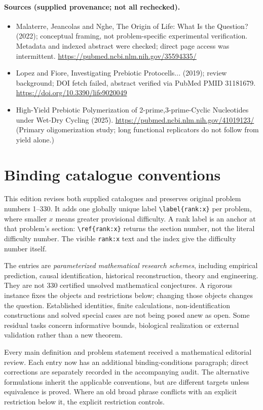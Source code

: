 \documentclass[11pt]{article}
\begin{document}
\paragraph{Sources (supplied provenance; not all rechecked).} \begin{itemize}
\item Malaterre, Jeancolas and Nghe, The Origin of Life: What Is the Question? (2022); conceptual framing, not problem-specific experimental verification. Metadata and indexed abstract were checked; direct page access was intermittent. \url{https://pubmed.ncbi.nlm.nih.gov/35594335/}
\item Lopez and Fiore, Investigating Prebiotic Protocells... (2019); review background; DOI fetch failed, abstract verified via PubMed PMID 31181679. \url{https://doi.org/10.3390/life9020049}
\item High-Yield Prebiotic Polymerization of 2-prime,3-prime-Cyclic Nucleotides under Wet-Dry Cycling (2025). \url{https://pubmed.ncbi.nlm.nih.gov/41019123/} (Primary oligomerization study; long functional replicators do not follow from yield alone.)
\end{itemize}


\section*{Binding catalogue conventions}
This edition revises both supplied catalogues and preserves original problem numbers 1--330. It adds one globally unique label \verb|\label{rank:x}| per problem, where smaller $x$ means greater provisional difficulty. A rank label is an anchor at that problem's section: \verb|\ref{rank:x}| returns the section number, not the literal difficulty number. The visible \texttt{rank:x} text and the index give the difficulty number itself.

The entries are \emph{parameterized mathematical research schemes}, including empirical prediction, causal identification, historical reconstruction, theory and engineering. They are not 330 certified unsolved mathematical conjectures. A rigorous instance fixes the objects and restrictions below; changing those objects changes the question. Established identities, finite calculations, non-identification constructions and solved special cases are not being posed anew as open. Some residual tasks concern informative bounds, biological realization or external validation rather than a new theorem.

Every main definition and problem statement received a mathematical editorial review. Each entry now has an additional binding-conditions paragraph; direct corrections are separately recorded in the accompanying audit. The alternative formulations inherit the applicable conventions, but are different targets unless equivalence is proved. Where an old broad phrase conflicts with an explicit restriction below it, the explicit restriction controls.
\end{document}
